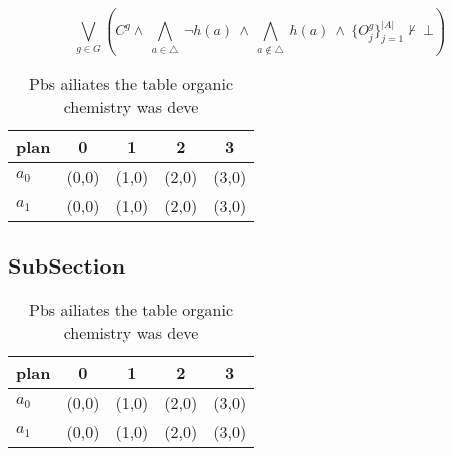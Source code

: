 \documentclass[a4paper]{article}
\begin{document}
\[\bigvee_{g\in G} (C^g \wedge\ \bigwedge_{a\in \triangle}\ \neg h(a)\ \wedge\ \bigwedge_{a\notin \triangle}\ h(a)\ \wedge\ \{O_j^g\}_{j=1}^{|A|} \nvdash\ \bot )\]

\begin{table}
\begin{adjustbox}{width=0.7\columnwidth}
\begin{tabular}{|l|l|l|l|l|}
\hline
\textbf{plan} & \multicolumn{1}{c|}{\textbf{0}} & \multicolumn{1}{c|}{\textbf{1}} & \multicolumn{1}{c|}{\textbf{2}} & \multicolumn{1}{c|}{\textbf{3}} \\ \hline
\textbf{$a_0$}  & (0,0) & (1,0) & (2,0) & (3,0) \\ \hline
\textbf{$a_1$}  & (0,0) & (1,0) & (2,0) & (3,0) \\ \hline
\end{tabular}
\end{adjustbox}
\caption{Pbs ailiates the table organic chemistry was deve
}
\end{table}

\subsection{SubSection}

\begin{table}
\begin{adjustbox}{width=0.7\columnwidth}
\begin{tabular}{|l|l|l|l|l|}
\hline
\textbf{plan} & \multicolumn{1}{c|}{\textbf{0}} & \multicolumn{1}{c|}{\textbf{1}} & \multicolumn{1}{c|}{\textbf{2}} & \multicolumn{1}{c|}{\textbf{3}} \\ \hline
\textbf{$a_0$}  & (0,0) & (1,0) & (2,0) & (3,0) \\ \hline
\textbf{$a_1$}  & (0,0) & (1,0) & (2,0) & (3,0) \\ \hline
\end{tabular}
\end{adjustbox}
\caption{Pbs ailiates the table organic chemistry was deve
}
\end{table}
\end{document}
